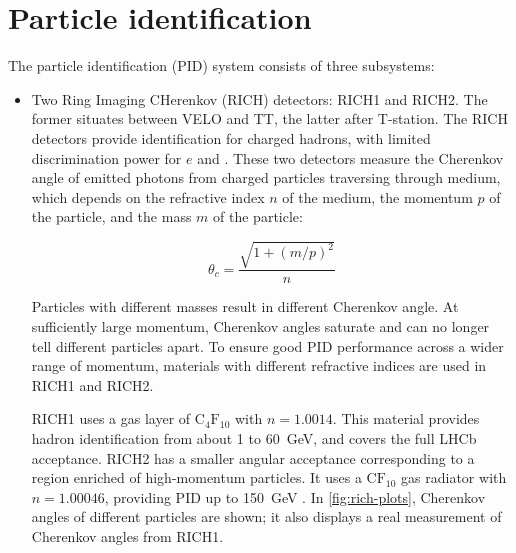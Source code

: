 \section{Particle identification}
\label{ref:detector:pid}

The particle identification (PID) system consists of three subsystems:

\begin{itemize}
    \item Two Ring Imaging CHerenkov (RICH) detectors:
        RICH1 and RICH2.
        The former situates between VELO and TT, the latter after T-station.
        The RICH detectors provide identification for charged hadrons,
        with limited discrimination power for $e$ and \muon.
        These two detectors measure the Cherenkov angle of emitted photons from
        charged particles traversing through medium,
        which depends on the refractive index $n$ of
        the medium, the momentum $p$ of the particle, and the mass $m$ of the
        particle:

        \begin{equation}
            \theta_c = \frac{\sqrt{1 + (m/p)^2}}{n}
        \end{equation}

        Particles with different masses result in different Cherenkov angle.
        At sufficiently large momentum,
        Cherenkov angles saturate and can no longer tell different particles
        apart.
        To ensure good PID performance across a wider range of momentum,
        materials with different refractive indices are used in RICH1 and RICH2.

        RICH1 uses a gas layer of $\text{C}_4 \text{F}_{10}$ with $n = 1.0014$.
        This material provides hadron identification from about 1 to 60~GeV,
        and covers the full LHCb acceptance.
        RICH2 has a smaller angular acceptance corresponding to a region enriched
        of high-momentum particles.
        It uses a $\text{C}\text{F}_{10}$ gas radiator with $n = 1.00046$,
        providing PID up to 150~GeV
        \cite{Belyaev_2021}.
        In \cref{fig:rich-plots}, Cherenkov angles of different particles are
        shown; it also displays a real measurement of Cherenkov angles from
        RICH1.


\end{itemize}
